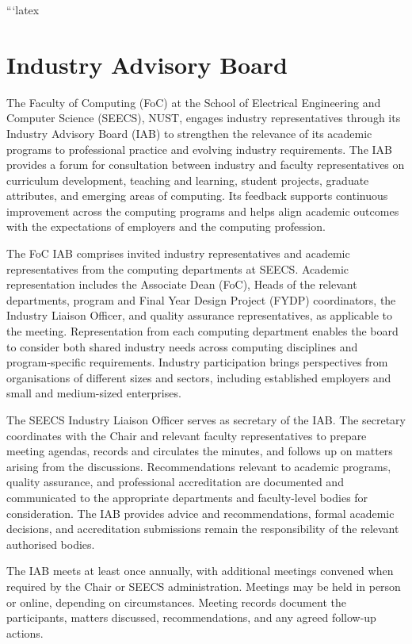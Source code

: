 ```latex
\section{Industry Advisory Board}

The Faculty of Computing (FoC) at the School of Electrical Engineering and Computer Science (SEECS), NUST, engages industry representatives through its Industry Advisory Board (IAB) to strengthen the relevance of its academic programs to professional practice and evolving industry requirements. The IAB provides a forum for consultation between industry and faculty representatives on curriculum development, teaching and learning, student projects, graduate attributes, and emerging areas of computing. Its feedback supports continuous improvement across the computing programs and helps align academic outcomes with the expectations of employers and the computing profession.

The FoC IAB comprises invited industry representatives and academic representatives from the computing departments at SEECS. Academic representation includes the Associate Dean (FoC), Heads of the relevant departments, program and Final Year Design Project (FYDP) coordinators, the Industry Liaison Officer, and quality assurance representatives, as applicable to the meeting. Representation from each computing department enables the board to consider both shared industry needs across computing disciplines and program-specific requirements. Industry participation brings perspectives from organisations of different sizes and sectors, including established employers and small and medium-sized enterprises.

The SEECS Industry Liaison Officer serves as secretary of the IAB. The secretary coordinates with the Chair and relevant faculty representatives to prepare meeting agendas, records and circulates the minutes, and follows up on matters arising from the discussions. Recommendations relevant to academic programs, quality assurance, and professional accreditation are documented and communicated to the appropriate departments and faculty-level bodies for consideration. The IAB provides advice and recommendations, formal academic decisions, and accreditation submissions remain the responsibility of the relevant authorised bodies.

The IAB meets at least once annually, with additional meetings convened when required by the Chair or SEECS administration. Meetings may be held in person or online, depending on circumstances. Meeting records document the participants, matters discussed, recommendations, and any agreed follow-up actions.

